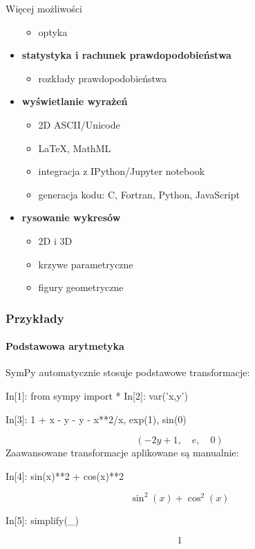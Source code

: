 \documentclass[10pt]{beamer}
\begin{document}
\begin{frame}{Więcej możliwości}
\begin{multicols}{2}
\begin{itemize}
\begin{itemize}
          \item optyka
        \end{itemize}
      \item \textbf{statystyka i rachunek prawdopodobieństwa}
        \begin{itemize}
          \tiny
          \item rozkłady prawdopodobieństwa
        \end{itemize}
      \item \textbf{wyświetlanie wyrażeń}
        \begin{itemize}
          \tiny
          \item 2D ASCII/Unicode
          \item LaTeX, MathML
          \item integracja z IPython/Jupyter notebook
          \item generacja kodu: C, Fortran, Python, JavaScript
        \end{itemize}
      \item \textbf{rysowanie wykresów}
        \begin{itemize}
          \tiny
          \item 2D i 3D
          \item krzywe parametryczne
          \item figury geometryczne
        \end{itemize}
    \end{itemize}
  \end{multicols}
\end{frame}

\begin{frame}[fragile]
  \frametitle{Przykłady}
  \framesubtitle{Podstawowa arytmetyka}

  SymPy automatycznie stosuje podstawowe transformacje:
  \begin{python}
    In[1]: from sympy import *
    In[2]: var('x,y')
  \end{python}
  \begin{python}
    In[3]: 1 + x - y - y - x**2/x, exp(1), sin(0)
  \end{python}
  \begin{equation*}
    \left ( - 2 y + 1, \quad e, \quad 0\right )
  \end{equation*}
  Zaawansowane transformacje aplikowane są manualnie:
  \begin{python}
    In[4]: sin(x)**2 + cos(x)**2
  \end{python}
  \begin{equation*}
    \sin^{2}{\left (x \right )} + \cos^{2}{\left (x \right )}
  \end{equation*}

  \begin{python}
    In[5]: simplify(_)
  \end{python}
  \begin{equation*}
    1
  \end{equation*}
\end{frame}
\end{document}
